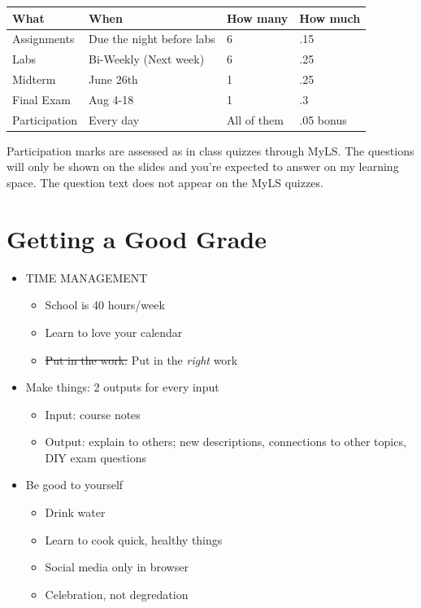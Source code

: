 \documentclass[
  letterpaper,
  DIV=11,
  numbers=noendperiod]{scrreprt}
\providecommand{\tightlist}{%
  \setlength{\itemsep}{0pt}\setlength{\parskip}{0pt}}\usepackage{longtable,booktabs,array}
\begin{document}
\begin{longtable}[]{@{}llll@{}}
\toprule\noalign{}
What & When & How many & How much \\
\midrule\noalign{}
\endhead
\bottomrule\noalign{}
\endlastfoot
Assignments & Due the night before labs & 6 & .15 \\
Labs & Bi-Weekly (Next week) & 6 & .25 \\
Midterm & June 26th & 1 & .25 \\
Final Exam & Aug 4-18 & 1 & .3 \\
Participation & Every day & All of them & .05 bonus \\
\end{longtable}

Participation marks are assessed as in class quizzes through MyLS. The
questions will only be shown on the slides and you're expected to answer
on my learning space. The question text does not appear on the MyLS
quizzes.

\hypertarget{getting-a-good-grade}{%
\section{Getting a Good Grade}\label{getting-a-good-grade}}

\begin{itemize}
\tightlist
\item
  TIME MANAGEMENT

  \begin{itemize}
  \tightlist
  \item
    School is 40 hours/week
  \item
    Learn to love your calendar
  \item
    \st{Put in the work.} Put in the \emph{right} work\lspace
  \end{itemize}
\item
  Make things: 2 outputs for every input

  \begin{itemize}
  \tightlist
  \item
    Input: course notes
  \item
    Output: explain to others; new descriptions, connections to other
    topics, DIY exam questions\lspace
  \end{itemize}
\item
  Be good to yourself

  \begin{itemize}
  \tightlist
  \item
    Drink water
  \item
    Learn to cook quick, healthy things
  \item
    Social media only in browser
  \item
    Celebration, not degredation
  \end{itemize}
\end{itemize}
\end{document}
